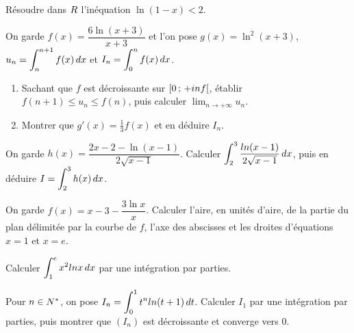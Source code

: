 \begin{annales}
Résoudre dans $R$ l'inéquation $\ln(1-x) < 2$.

On garde $f(x) = \dfrac{6\ln(x+3)}{x+3}$ et l'on pose
$g(x) = \ln^{2}(x+3)$,
$u_{n} = \displaystyle\int_{n}^{n+1}f(x)\,dx$ et
$I_{n} = \displaystyle\int_{0}^{n}f(x)\,dx$.
\begin{enumerate}[label=\textbf{\alph*)}, leftmargin=*, itemsep=0.15em]
  \item Sachant que $f$ est décroissante sur $\left[0\,;\,+inf\right[$,
        établir $f(n+1) \leq u_{n} \leq f(n)$, puis calculer
        $\lim_{n\to+\infty}u_{n}$.
  \item Montrer que $g'(x) = \frac13 f(x)$ et en déduire $I_{n}$.
\end{enumerate}

On garde $h(x) = \dfrac{2x-2-\ln(x-1)}{2\sqrt{x-1}}$. Calculer
$\displaystyle\int_{2}^{3}\frac{ln(x-1)}{2\sqrt{x-1}}\,dx$, puis en déduire
$I = \displaystyle\int_{2}^{3}h(x)\,dx$.

On garde $f(x) = x-3-\dfrac{3\ln x}{x}$. Calculer l'aire, en unités d'aire,
de la partie du plan délimitée par la courbe de $f$, l'axe des abscisses et
les droites d'équations $x = 1$ et $x = e$.

Calculer $\displaystyle\int_{1}^{e}x^{2}ln x\,dx$ par une intégration par
parties.

Pour $n\in N^{*}$, on pose
$I_{n} = \displaystyle\int_{0}^{1}t^{n}ln(t+1)\,dt$. Calculer $I_{1}$ par une
intégration par parties, puis montrer que $(I_{n})$ est décroissante et
converge vers $0$.
\end{annales}

